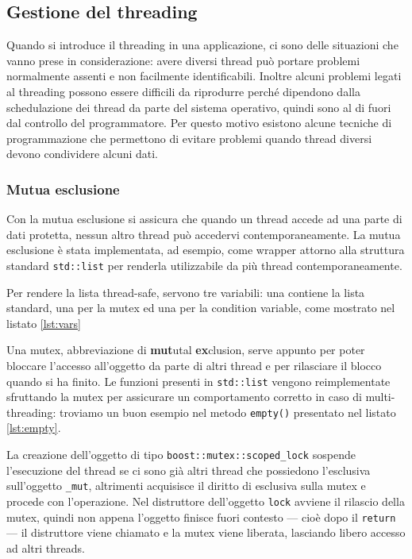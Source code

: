 

\subsection{Gestione del threading}
Quando si introduce il threading in una applicazione, ci sono delle situazioni
che vanno prese in considerazione: avere diversi thread pu\`o portare problemi
normalmente assenti e non facilmente identificabili. Inoltre alcuni problemi
legati al threading possono essere difficili da riprodurre perch\'e  dipendono
dalla schedulazione dei thread da parte del sistema operativo, quindi sono al di
fuori dal controllo del programmatore. Per questo motivo esistono alcune
tecniche di programmazione che permettono di evitare problemi quando thread
diversi devono condividere alcuni dati.

\subsubsection{Mutua esclusione}

Con la mutua esclusione si assicura che quando un thread accede ad una parte di
dati protetta, nessun altro thread pu\`o accedervi contemporaneamente. La mutua
esclusione \`e stata implementata, ad esempio, come wrapper attorno alla
struttura standard \texttt{std::list} per renderla utilizzabile da pi\`u thread
contemporaneamente.

Per rendere la lista thread-safe, servono tre variabili: una contiene la lista
standard, una per la mutex ed una per la condition variable, come mostrato nel
listato \ref{lst:vars}

Una mutex, abbreviazione di \textbf{mut}utal \textbf{ex}clusion, serve appunto
per poter bloccare l'accesso all'oggetto da parte di altri thread e per
rilasciare il blocco quando si ha finito. Le funzioni presenti in
\texttt{std::list} vengono reimplementate sfruttando la mutex per assicurare un
comportamento corretto in caso di multi-threading: troviamo un buon esempio nel
metodo \texttt{empty()} presentato nel listato \ref{lst:empty}.


La creazione dell'oggetto di tipo \texttt{boost::mutex::scoped\_lock} sospende
l'esecuzione del thread se ci sono gi\`a altri thread che possiedono l'esclusiva
sull'oggetto \texttt{\_mut}, altrimenti acquisisce il diritto di esclusiva
sulla mutex e procede con l'operazione. Nel distruttore dell'oggetto
\texttt{lock} avviene il rilascio della mutex, quindi non appena l'oggetto
finisce fuori contesto --- cio\`e dopo il \texttt{return} --- il distruttore
viene chiamato e la mutex viene liberata, lasciando libero accesso ad altri
threads.

